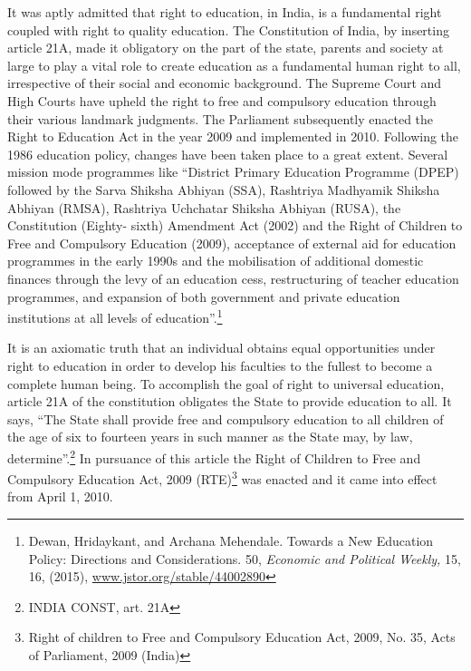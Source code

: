 \begin{multicols}{2}
\noi
It was aptly admitted that right to education, in India, is a fundamental right coupled with
right to quality education. The Constitution of India, by inserting article 21A, made it
obligatory on the part of the state, parents and society at large to play a vital role to create
education as a fundamental human right to all, irrespective of their social and economic
background. The Supreme Court and High Courts have upheld the right to free and
compulsory education through their various landmark judgments. The Parliament
subsequently enacted the Right to Education Act in the year 2009 and implemented in 2010.
Following the 1986 education policy, changes have been taken place to a great extent.
Several mission mode programmes like “District Primary Education Programme (DPEP)
followed by the Sarva Shiksha Abhiyan (SSA), Rashtriya Madhyamik Shiksha Abhiyan
(RMSA), Rashtriya Uchchatar Shiksha Abhiyan (RUSA), the Constitution (Eighty- sixth)
Amendment Act (2002) and the Right of Children to Free and Compulsory Education (2009),
acceptance of external aid for education programmes in the early 1990s and the mobilisation
of additional domestic finances through the levy of an education cess, restructuring of teacher
education programmes, and expansion of both government and private education institutions
at all levels of education”.\footnote{Dewan, Hridaykant, and Archana Mehendale. Towards a New Education Policy: Directions and Considerations. 50, \textit{Economic and Political Weekly,} 15, 16, (2015), \url{www.jstor.org/stable/44002890}}


\noi
It is an axiomatic truth that an individual obtains equal opportunities under right to education
in order to develop his faculties to the fullest to become a complete human being. To
accomplish the goal of right to universal education, article 21A of the constitution obligates
the State to provide education to all. It says, “The State shall provide free and compulsory
education to all children of the age of six to fourteen years in such manner as the State may,
by law, determine”.\footnote{INDIA CONST, art. 21A} In pursuance of this article the Right of Children to Free and
Compulsory Education Act, 2009 (RTE)\footnote{Right of children to Free and Compulsory Education Act, 2009, No. 35, Acts of Parliament, 2009 (India)} was enacted and it came into effect from April 1, 2010.


\end{multicols}
